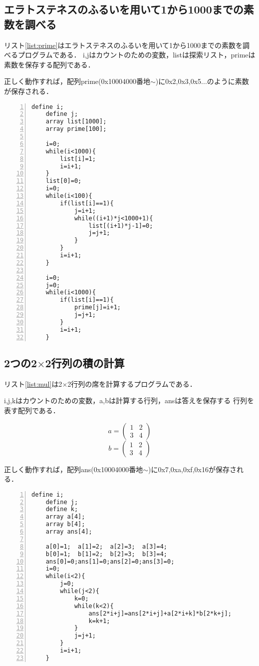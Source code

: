 \documentclass[11pt]{jarticle}
\begin{document}
\subsection{エラトステネスのふるいを用いて1から1000までの素数を調べる}

リスト\ref{list:prime}はエラトステネスのふるいを用いて1から1000までの素数を調べるプログラムである．
i,jはカウントのための変数，listは探索リスト，primeは素数を保存する配列である．

正しく動作すれば，配列prime(0x10004000番地$\sim$)に0x2,0x3,0x5...のように素数が保存される．

\begin{lstlisting}[caption=エラトステネスのふるい,label=list:prime,numbers=left]
    define i;
    define j;
    array list[1000];
    array prime[100];
    
    i=0;
    while(i<1000){
        list[i]=1;
        i=i+1;
    }
    list[0]=0;
    i=0;
    while(i<100){
        if(list[i]==1){
            j=i+1;
            while((i+1)*j<1000+1){
                list[(i+1)*j-1]=0;
                j=j+1;
            }
        }
        i=i+1; 
    }
    
    i=0;
    j=0;
    while(i<1000){
        if(list[i]==1){
            prime[j]=i+1;
            j=j+1;
        }
        i=i+1;
    }
\end{lstlisting}

\subsection{2つの2$\times$2行列の積の計算}

リスト\ref{list:mul}は2$\times$2行列の席を計算するプログラムである．

i,j,kはカウントのための変数，a,bは計算する行列，ansは答えを保存する
行列を表す配列である．

\[
    a=\left(
        \begin{array}{cc}
            1 & 2 \\
            3 & 4
        \end{array}
    \right)
\]
\[
    b=\left(
        \begin{array}{cc}
            1 & 2 \\
            3 & 4
        \end{array}
    \right)
\]

正しく動作すれば，配列ans(0x10004000番地$\sim$)に0x7,0xa,0xf,0x16が保存される．

\begin{lstlisting}[caption=行列の積,label=list:mul,numbers=left]
    define i;
    define j;
    define k;
    array a[4];
    array b[4];
    array ans[4];

    a[0]=1;  a[1]=2;  a[2]=3;  a[3]=4;
    b[0]=1;  b[1]=2;  b[2]=3;  b[3]=4;
    ans[0]=0;ans[1]=0;ans[2]=0;ans[3]=0;
    i=0;
    while(i<2){
        j=0;
        while(j<2){
            k=0;
            while(k<2){
                ans[2*i+j]=ans[2*i+j]+a[2*i+k]*b[2*k+j];
                k=k+1;
            }
            j=j+1;
        }
        i=i+1;
    }
\end{lstlisting}
\end{document}
